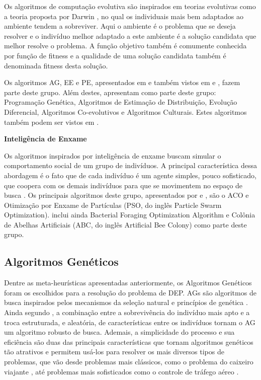 Os algoritmos de computação evolutiva são inspirados em teorias evolutivas \cite{Talbi2009} como a teoria proposta por Darwin \cite{Darwin1859}, no qual os individuais mais bem adaptados ao ambiente tendem a sobreviver. Aqui o ambiente é o problema que se deseja resolver e o indivíduo melhor adaptado a este ambiente é a solução candidata que melhor resolve o problema. A função objetivo também é comumente conhecida por função de fitness e a qualidade de uma solução candidata também é denominada fitness desta solução.

Os algoritmos AG, EE e PE, apresentados em  e também vistos em  e , fazem parte deste grupo. Além destes,  apresentam como parte deste grupo: Programação Genética, Algoritmos de Estimação de Distribuição, Evolução Diferencial, Algoritmos Co-evolutivos e Algoritmos Culturais. Estes algoritmos também podem ser vistos em . 

\textbf{Inteligência de Enxame}

Os algoritmos inspirados por inteligência de enxame buscam simular o comportamento social de um grupo de indivíduos. A principal característica dessa abordagem é o fato que de cada indivíduo é um agente simples, pouco sofisticado, que coopera com os demais indivíduos para que se movimentem no espaço de busca \cite{Talbi2009}. Os principais algoritmos deste grupo, apresentados por  e , são o ACO e Otimização por Enxame de Partículas (PSO, do inglês Particle Swarm Optimization).  inclui ainda Bacterial Foraging Optimization Algorithm e Colônia de Abelhas Artificiais (ABC, do inglês Artificial Bee Colony) como parte deste grupo.

\subsection{Algoritmos Genéticos}

Dentre as meta-heurísticas apresentadas anteriormente, os Algoritmos Genéticos foram os escolhidos para a resolução do problema de DEP. AGs são algoritmos de busca inspirados pelos mecanismos da seleção natural e princípios de genética \cite{Goldberg1989}. Ainda segundo , a combinação entre a sobrevivência do indivíduo mais apto e a troca estruturada, e aleatória, de características entre os indivíduos tornam o AG um algoritmo robusto de busca. Ademais, a simplicidade do processo e sua eficiência são duas das principais características que tornam algoritmos genéticos tão atrativos e permitem usá-los para resolver os mais diversos tipos de problemas, que vão desde problemas mais clássicos, como o problema do caixeiro viajante \cite{Grefenstette1985}, até problemas mais sofisticados como o controle de tráfego aéreo \cite{Sergeeva2017}. 


